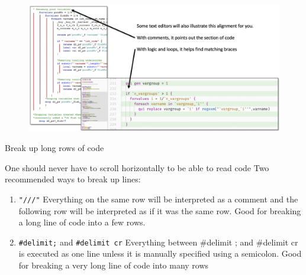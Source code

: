 \documentclass[aspectratio=169]{beamer}
\begin{document}
\begin{frame}

	\begin{figure}
		\centering
		\includegraphics[width=\linewidth]{img/White_space3}
	\end{figure}

\end{frame}


\begin{frame}{Break up long rows of code}

One should never have to scroll horizontally to be able to read code
Two recommended ways to break up lines:

	\begin{enumerate}
	\item<1>  \texttt{"///"}
		\leavevmode 	\newline Everything on the same row will be interpreted as a comment and the following row will be interpreted as if it was the same row.
		\leavevmode 	\newline Good for breaking a long line of code into a few rows.
	
	\item<1>  \texttt{{\#}delimit;}  and \texttt{{\#}delimit cr} 
		\leavevmode 	\newline Everything between {\#}delimit ; and  {\#}delimit cr is executed as one line unless it is manually specified using a semicolon.
		\leavevmode 	\newline  Good for breaking a very long line of code into many rows
	\end{enumerate}

\end{frame}
\end{document}
